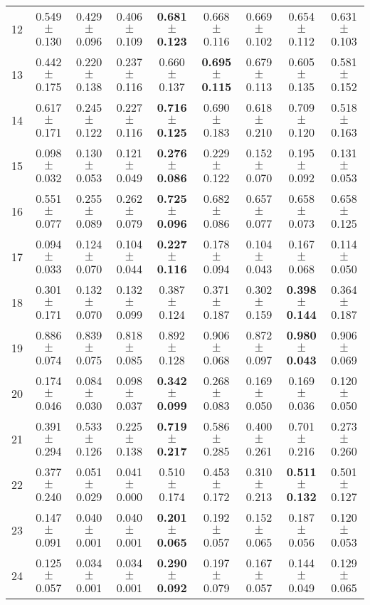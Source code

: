 \begin{table}[!ht]
{\begin{tabular}{r c c c c c c c c}
12 & 0.549 $\pm$ 0.130 & 0.429 $\pm$ 0.096 & 0.406 $\pm$ 0.109 & \textbf{0.681 $\pm$ 0.123} & 0.668 $\pm$ 0.116 & 0.669 $\pm$ 0.102 & 0.654 $\pm$ 0.112 & 0.631 $\pm$ 0.103 \\
13 & 0.442 $\pm$ 0.175 & 0.220 $\pm$ 0.138 & 0.237 $\pm$ 0.116 & 0.660 $\pm$ 0.137 & \textbf{0.695 $\pm$ 0.115} & 0.679 $\pm$ 0.113 & 0.605 $\pm$ 0.135 & 0.581 $\pm$ 0.152 \\
14 & 0.617 $\pm$ 0.171 & 0.245 $\pm$ 0.122 & 0.227 $\pm$ 0.116 & \textbf{0.716 $\pm$ 0.125} & 0.690 $\pm$ 0.183 & 0.618 $\pm$ 0.210 & 0.709 $\pm$ 0.120 & 0.518 $\pm$ 0.163 \\
15 & 0.098 $\pm$ 0.032 & 0.130 $\pm$ 0.053 & 0.121 $\pm$ 0.049 & \textbf{0.276 $\pm$ 0.086} & 0.229 $\pm$ 0.122 & 0.152 $\pm$ 0.070 & 0.195 $\pm$ 0.092 & 0.131 $\pm$ 0.053 \\
16 & 0.551 $\pm$ 0.077 & 0.255 $\pm$ 0.089 & 0.262 $\pm$ 0.079 & \textbf{0.725 $\pm$ 0.096} & 0.682 $\pm$ 0.086 & 0.657 $\pm$ 0.077 & 0.658 $\pm$ 0.073 & 0.658 $\pm$ 0.125 \\
17 & 0.094 $\pm$ 0.033 & 0.124 $\pm$ 0.070 & 0.104 $\pm$ 0.044 & \textbf{0.227 $\pm$ 0.116} & 0.178 $\pm$ 0.094 & 0.104 $\pm$ 0.043 & 0.167 $\pm$ 0.068 & 0.114 $\pm$ 0.050 \\
18 & 0.301 $\pm$ 0.171 & 0.132 $\pm$ 0.070 & 0.132 $\pm$ 0.099 & 0.387 $\pm$ 0.124 & 0.371 $\pm$ 0.187 & 0.302 $\pm$ 0.159 & \textbf{0.398 $\pm$ 0.144} & 0.364 $\pm$ 0.187 \\
19 & 0.886 $\pm$ 0.074 & 0.839 $\pm$ 0.075 & 0.818 $\pm$ 0.085 & 0.892 $\pm$ 0.128 & 0.906 $\pm$ 0.068 & 0.872 $\pm$ 0.097 & \textbf{0.980 $\pm$ 0.043} & 0.906 $\pm$ 0.069 \\
20 & 0.174 $\pm$ 0.046 & 0.084 $\pm$ 0.030 & 0.098 $\pm$ 0.037 & \textbf{0.342 $\pm$ 0.099} & 0.268 $\pm$ 0.083 & 0.169 $\pm$ 0.050 & 0.169 $\pm$ 0.036 & 0.120 $\pm$ 0.050 \\
21 & 0.391 $\pm$ 0.294 & 0.533 $\pm$ 0.126 & 0.225 $\pm$ 0.138 & \textbf{0.719 $\pm$ 0.217} & 0.586 $\pm$ 0.285 & 0.400 $\pm$ 0.261 & 0.701 $\pm$ 0.216 & 0.273 $\pm$ 0.260 \\
22 & 0.377 $\pm$ 0.240 & 0.051 $\pm$ 0.029 & 0.041 $\pm$ 0.000 & 0.510 $\pm$ 0.174 & 0.453 $\pm$ 0.172 & 0.310 $\pm$ 0.213 & \textbf{0.511 $\pm$ 0.132} & 0.501 $\pm$ 0.127 \\
23 & 0.147 $\pm$ 0.091 & 0.040 $\pm$ 0.001 & 0.040 $\pm$ 0.001 & \textbf{0.201 $\pm$ 0.065} & 0.192 $\pm$ 0.057 & 0.152 $\pm$ 0.065 & 0.187 $\pm$ 0.056 & 0.120 $\pm$ 0.053 \\
24 & 0.125 $\pm$ 0.057 & 0.034 $\pm$ 0.001 & 0.034 $\pm$ 0.001 & \textbf{0.290 $\pm$ 0.092} & 0.197 $\pm$ 0.079 & 0.167 $\pm$ 0.057 & 0.144 $\pm$ 0.049 & 0.129 $\pm$ 0.065 \\

\end{tabular}}
\end{table}

